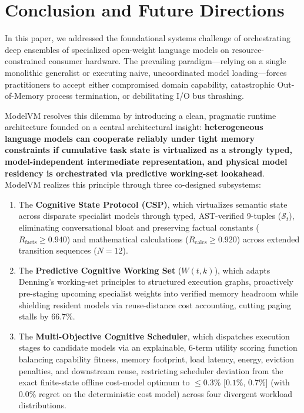 \section{Conclusion and Future Directions}
\label{sec:conclusion}

In this paper, we addressed the foundational systems challenge of orchestrating deep ensembles of specialized open-weight language models on resource-constrained consumer hardware. The prevailing paradigm—relying on a single monolithic generalist or executing naive, uncoordinated model loading—forces practitioners to accept either compromised domain capability, catastrophic Out-of-Memory process termination, or debilitating I/O bus thrashing.

ModelVM resolves this dilemma by introducing a clean, pragmatic runtime architecture founded on a central architectural insight: \textbf{heterogeneous language models can cooperate reliably under tight memory constraints if cumulative task state is virtualized as a strongly typed, model-independent intermediate representation, and physical model residency is orchestrated via predictive working-set lookahead}. ModelVM realizes this principle through three co-designed subsystems:
\begin{enumerate}
    \item The \textbf{Cognitive State Protocol (CSP)}, which virtualizes semantic state across disparate specialist models through typed, AST-verified 9-tuples ($\mathcal{S}_t$), eliminating conversational bloat and preserving factual constants ($R_{\text{facts}} \ge 0.940$) and mathematical calculations ($R_{\text{calcs}} \ge 0.920$) across extended transition sequences ($N=12$).
    \item The \textbf{Predictive Cognitive Working Set} ($W(t, k)$), which adapts Denning's working-set principles to structured execution graphs, proactively pre-staging upcoming specialist weights into verified memory headroom while shielding resident models via reuse-distance cost accounting, cutting paging stalls by $66.7\%$.
    \item The \textbf{Multi-Objective Cognitive Scheduler}, which dispatches execution stages to candidate models via an explainable, 6-term utility scoring function balancing capability fitness, memory footprint, load latency, energy, eviction penalties, and downstream reuse, restricting scheduler deviation from the exact finite-state offline cost-model optimum to $\le 0.3\%$ [$0.1\%$, $0.7\%$] (with $0.0\%$ regret on the deterministic cost model) across four divergent workload distributions.
\end{enumerate}

